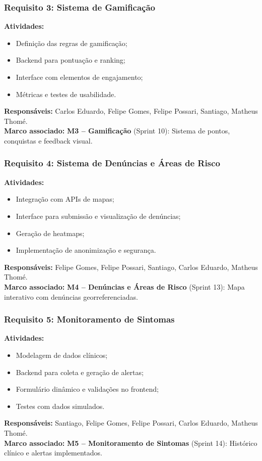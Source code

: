 \documentclass[a5paper, 12pt]{article}
\begin{document}
\subsubsection*{Requisito 3: Sistema de Gamificação}
\textbf{Atividades:}
\begin{itemize}
  \item Definição das regras de gamificação;
  \item Backend para pontuação e ranking;
  \item Interface com elementos de engajamento;
  \item Métricas e testes de usabilidade.
\end{itemize}
\textbf{Responsáveis:} Carlos Eduardo, Felipe Gomes, Felipe Possari, Santiago, Matheus Thomé. \\
\textbf{Marco associado:} \textbf{M3 – Gamificação} (Sprint 10): Sistema de pontos, conquistas e feedback visual.

\subsubsection*{Requisito 4: Sistema de Denúncias e Áreas de Risco}
\textbf{Atividades:}
\begin{itemize}
  \item Integração com APIs de mapas;
  \item Interface para submissão e visualização de denúncias;
  \item Geração de heatmaps;
  \item Implementação de anonimização e segurança.
\end{itemize}
\textbf{Responsáveis:} Felipe Gomes, Felipe Possari, Santiago, Carlos Eduardo, Matheus Thomé. \\
\textbf{Marco associado:} \textbf{M4 – Denúncias e Áreas de Risco} (Sprint 13): Mapa interativo com denúncias georreferenciadas.

\subsubsection*{Requisito 5: Monitoramento de Sintomas}
\textbf{Atividades:}
\begin{itemize}
  \item Modelagem de dados clínicos;
  \item Backend para coleta e geração de alertas;
  \item Formulário dinâmico e validações no frontend;
  \item Testes com dados simulados.
\end{itemize}
\textbf{Responsáveis:} Santiago, Felipe Gomes, Felipe Possari, Carlos Eduardo, Matheus Thomé. \\
\textbf{Marco associado:} \textbf{M5 – Monitoramento de Sintomas} (Sprint 14): Histórico clínico e alertas implementados.
\end{document}
